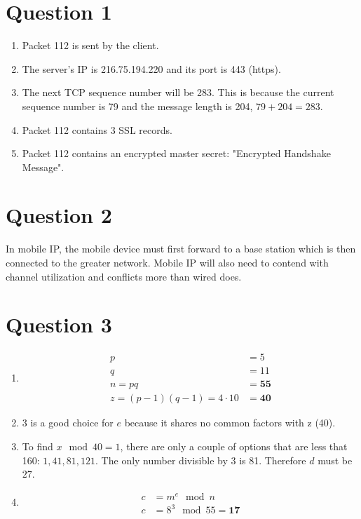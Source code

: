 \documentclass[12pt,letterpaper]{article}
\begin{document}
\section*{Question 1}

\begin{enumerate}[label=\alph*)]
\item Packet 112 is sent by the client.
\item The server's IP is 216.75.194.220 and its port is 443 (https).
\item The next TCP sequence number will be 283. This is because the current
      sequence number is 79 and the message length is 204, $79+204=283$.
\item Packet 112 contains 3 SSL records.
\item Packet 112 contains an encrypted master secret: "Encrypted Handshake Message". 
\end{enumerate}

\section*{Question 2}
In mobile IP, the mobile device must first forward to a base station which is
then connected to the greater network. Mobile IP will also need to contend with
channel utilization and conflicts more than wired does.

\section*{Question 3}
\begin{enumerate}[label=\alph*)]
\item
\begin{align*}
p &= 5\\
q &= 11\\
n = pq &= \mathbf{55}\\
z = (p-1)(q-1) = 4 \cdot 10 &= \mathbf{40} 
\end{align*}

\item 3 is a good choice for $e$ because it shares no common factors with z (40).
\item To find $x\mod 40 = 1$, there are only a couple of options that are less that
160: $1, 41, 81, 121 $. The only number divisible by 3 is 81. Therefore $d$ must be
$27$.
\item
\begin{align*}
c &= m^e \mod n\\
c &= 8^3 \mod 55 = \mathbf{17}
\end{align*}
\end{enumerate}
\end{document}

